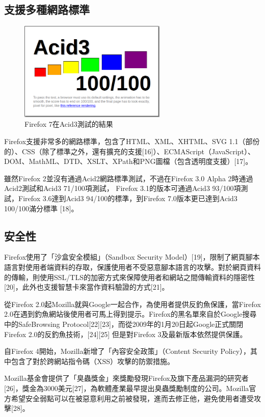 \documentclass[12pt]{article}
\begin{document}
\subsection{支援多種網路標準}

\begin{figure}
\centering
\includegraphics[width=70mm]{Firefox_7_Acid_3_Result}
\caption{Firefox 7在Acid3測試的結果}
\end{figure}

Firefox支援非常多的網路標準，包含了HTML、XML、XHTML、SVG 1.1（部份的）、CSS（除了標準之外，還有擴充的支援[16]）、ECMAScript（JavaScript）、DOM、MathML、DTD、XSLT、XPath和PNG圖檔（包含透明度支援）[17]。

雖然Firefox 2並沒有通過Acid2網路標準測試，不過在Firefox 3.0 Alpha 2時通過Acid2測試和Acid3 71/100項測試， Firefox 3.1的版本可通過Acid3 93/100項測試，Firefox 3.6達到Acid3 94/100的標準，到Firefox 7.0版本更已達到Acid3 100/100滿分標準 [18]。

\subsection{安全性}

Firefox使用了「沙盒安全模組」（Sandbox Security Model）[19]，限制了網頁腳本語言對使用者端資料的存取，保護使用者不受惡意腳本語言的攻擊。對於網頁資料的傳輸，則使用SSL/TLS的加密方式來保障使用者和網站之間傳輸資料的隱密性[20]，此外也支援智慧卡來當作資料驗證的方式[21]。

從Firefox 2.0起Mozilla就與Google一起合作，為使用者提供反釣魚保護，當Firefox 2.0在遇到釣魚網站後使用者可馬上得到提示。Firefox的黑名單來自於Google搜尋中的SafeBrowsing Protocol[22][23]，而從2009年的1月20日起Google正式關閉Firefox 2.0的反釣魚技術，[24][25] 但是對Firefox 3及最新版本依然提供保護。

自Firefox 4開始，Mozilla新增了「內容安全政策」（Content Security Policy），其中包含了對於跨網站指令碼（XSS）攻擊的防禦措施。

Mozilla基金會提供了「臭蟲獎金」來獎勵發現Firefox及旗下產品漏洞的研究者[26]，獎金為3000美元[27]，為軟體產業最早提出臭蟲獎勵制度的公司。Mozilla官方希望安全弱點可以在被惡意利用之前被發現，進而去修正他，避免使用者遭受攻擊[28]。
\end{document}
